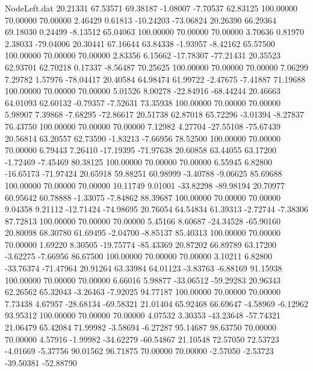 \begin{filecontents}{NodeLeft.dat}
  20.21331   67.53571   69.38187    -1.08007   -7.70537   62.83125  100.00000   70.00000   70.00000    2.46429    0.61813  -10.24203  -73.06824
  20.26390   66.29364   69.18030     0.24499   -8.13512   65.04063  100.00000   70.00000   70.00000    3.70636    0.81970    2.38033  -79.04006
  20.30441   67.16644   63.84338    -1.93957   -8.42162   65.57500  100.00000   70.00000   70.00000    2.83356    6.15662  -17.78307  -77.21431
  20.35523   62.93701   62.70218     0.17337   -8.56487   70.25625  100.00000   70.00000   70.00000    7.06299    7.29782    1.57976  -78.04417
  20.40584   64.98474   61.99722    -2.47675   -7.41887   71.19688  100.00000   70.00000   70.00000    5.01526    8.00278  -22.84916  -68.44244
  20.46663   64.01093   62.60132    -0.79357   -7.52631   73.35938  100.00000   70.00000   70.00000    5.98907    7.39868   -7.68295  -72.86617
  20.51738   62.87018   65.72296    -3.01394   -8.27837   76.43750  100.00000   70.00000   70.00000    7.12982    4.27704  -27.55108  -75.67439
  20.56814   63.20557   62.73590    -1.83213   -7.66956   78.52500  100.00000   70.00000   70.00000    6.79443    7.26410  -17.19395  -71.97638
  20.60858   63.44055   63.17200    -1.72469   -7.45469   80.38125  100.00000   70.00000   70.00000    6.55945    6.82800  -16.65173  -71.97424
  20.65918   59.88251   60.98999    -3.40788   -9.06625   85.69688  100.00000   70.00000   70.00000   10.11749    9.01001  -33.82298  -89.98194
  20.70977   60.95642   60.78888    -1.33075   -7.84862   88.39687  100.00000   70.00000   70.00000    9.04358    9.21112  -12.71424  -74.98695
  20.76054   64.54834   61.39313    -2.72744   -7.38306   87.72813  100.00000   70.00000   70.00000    5.45166    8.60687  -24.34528  -65.90160
  20.80098   68.30780   61.69495    -2.04700   -8.85137   85.40313  100.00000   70.00000   70.00000    1.69220    8.30505  -19.75774  -85.43369
  20.87202   66.89789   63.17200    -3.62275   -7.66956   86.67500  100.00000   70.00000   70.00000    3.10211    6.82800  -33.76374  -71.47964
  20.91264   63.33984   64.01123    -3.83763   -6.88169   91.15938  100.00000   70.00000   70.00000    6.66016    5.98877  -33.06512  -59.29283
  20.96343   62.26562   65.32043    -3.26463   -7.92025   94.77187  100.00000   70.00000   70.00000    7.73438    4.67957  -28.68134  -69.58321
  21.01404   65.92468   66.69647    -4.58969   -6.12962   93.95312  100.00000   70.00000   70.00000    4.07532    3.30353  -43.23648  -57.74321
  21.06479   65.42084   71.99982    -3.58694   -6.27287   95.14687   98.63750   70.00000   70.00000    4.57916   -1.99982  -34.62279  -60.54867
  21.10548   72.57050   72.53723    -4.01669   -5.37756   90.01562   96.71875   70.00000   70.00000   -2.57050   -2.53723  -39.50381  -52.88790

\end{filecontents}
